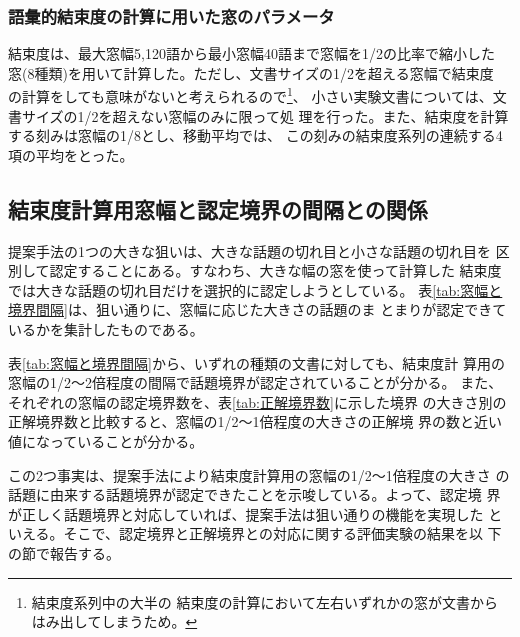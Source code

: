 \subsubsection{語彙的結束度の計算に用いた窓のパラメータ}

結束度は、最大窓幅5,120語から最小窓幅40語まで窓幅を1/2の比率で縮小した
窓(8種類)を用いて計算した。ただし、文書サイズの1/2を超える窓幅で結束度
の計算をしても意味がないと考えられるので\footnote{結束度系列中の大半の
  結束度の計算において左右いずれかの窓が文書からはみ出してしまうため。}、
小さい実験文書については、文書サイズの1/2を超えない窓幅のみに限って処
理を行った。また、結束度を計算する刻みは窓幅の1/8とし、移動平均では、
この刻みの結束度系列の連続する4項の平均をとった。

\subsection{結束度計算用窓幅と認定境界の間隔との関係}
\label{sect:窓幅と認定境界の間隔との関係}

提案手法の1つの大きな狙いは、大きな話題の切れ目と小さな話題の切れ目を
区別して認定することにある。すなわち、大きな幅の窓を使って計算した
結束度では大きな話題の切れ目だけを選択的に認定しようとしている。
表\ref{tab:窓幅と境界間隔}は、狙い通りに、窓幅に応じた大きさの話題のま
とまりが認定できているかを集計したものである。

表\ref{tab:窓幅と境界間隔}から、いずれの種類の文書に対しても、結束度計
算用の窓幅の1/2〜2倍程度の間隔で話題境界が認定されていることが分かる。
また、それぞれの窓幅の認定境界数を、表\ref{tab:正解境界数}に示した境界
の大きさ別の正解境界数と比較すると、窓幅の1/2〜1倍程度の大きさの正解境
界の数と近い値になっていることが分かる。

この2つ事実は、提案手法により結束度計算用の窓幅の1/2〜1倍程度の大きさ
の話題に由来する話題境界が認定できたことを示唆している。よって、認定境
界が正しく話題境界と対応していれば、提案手法は狙い通りの機能を実現した
といえる。そこで、認定境界と正解境界との対応に関する評価実験の結果を以
下の節で報告する。

